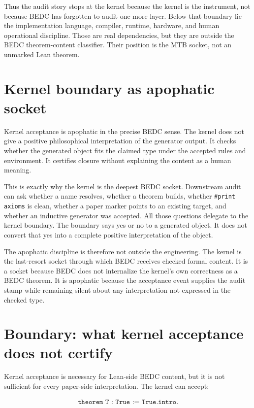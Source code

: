 Thus the audit story stops at the kernel because the kernel is the instrument,
not because BEDC has forgotten to audit one more layer. Below that boundary lie
the implementation language, compiler, runtime, hardware, and human operational
discipline. Those are real dependencies, but they are outside the BEDC
theorem-content classifier. Their position is the MTB socket, not an unmarked
Lean theorem.

\section{Kernel boundary as apophatic socket}
\label{sec:kernel-audit-witness-apophatic-socket}

Kernel acceptance is apophatic in the precise BEDC sense. The kernel does not
give a positive philosophical interpretation of the generator output. It checks
whether the generated object fits the claimed type under the accepted rules and
environment. It certifies closure without explaining the content as a human
meaning.

This is exactly why the kernel is the deepest BEDC socket. Downstream audit can
ask whether a name resolves, whether a theorem builds, whether
\texttt{\#print axioms} is clean, whether a paper marker points to an existing
target, and whether an inductive generator was accepted. All those questions
delegate to the kernel boundary. The boundary says yes or no to a generated
object. It does not convert that yes into a complete positive interpretation of
the object.

The apophatic discipline is therefore not outside the engineering. The kernel
is the last-resort socket through which BEDC receives checked formal content. It
is a socket because BEDC does not internalize the kernel's own correctness as a
BEDC theorem. It is apophatic because the acceptance event supplies the audit
stamp while remaining silent about any interpretation not expressed in the
checked type.

\section{Boundary: what kernel acceptance does not certify}
\label{sec:kernel-audit-witness-boundary}

Kernel acceptance is necessary for Lean-side BEDC content, but it is not
sufficient for every paper-side interpretation. The kernel can accept:

$$
\begin{aligned}
\texttt{theorem T : True := True.intro}.
\end{aligned}
$$

